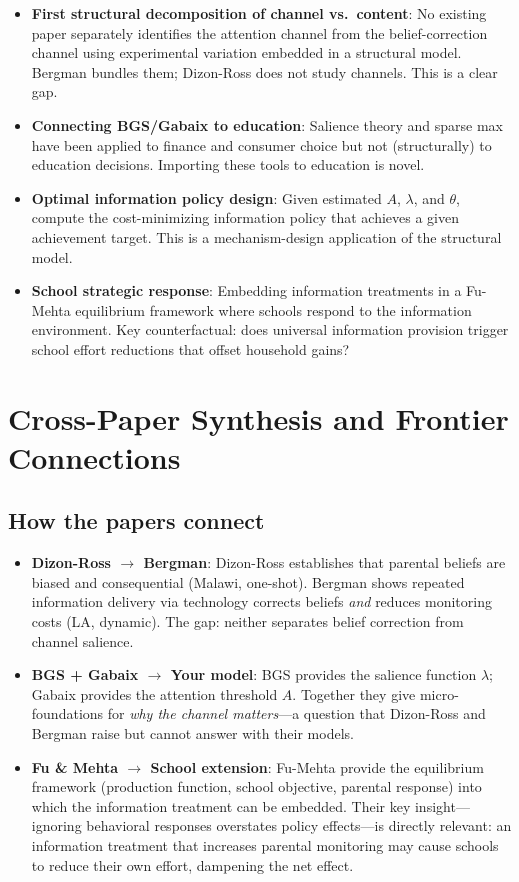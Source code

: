 \documentclass[11pt]{article}
\begin{document}
\begin{itemize}
  \item \textbf{First structural decomposition of channel vs.\ content}: No existing paper separately identifies the attention channel from the belief-correction channel using experimental variation embedded in a structural model. Bergman bundles them; Dizon-Ross does not study channels. This is a clear gap.
  \item \textbf{Connecting BGS/Gabaix to education}: Salience theory and sparse max have been applied to finance and consumer choice but not (structurally) to education decisions. Importing these tools to education is novel.
  \item \textbf{Optimal information policy design}: Given estimated $A$, $\lambda$, and $\theta$, compute the cost-minimizing information policy that achieves a given achievement target. This is a mechanism-design application of the structural model.
  \item \textbf{School strategic response}: Embedding information treatments in a Fu-Mehta equilibrium framework where schools respond to the information environment. Key counterfactual: does universal information provision trigger school effort reductions that offset household gains?
\end{itemize}

\section{Cross-Paper Synthesis and Frontier Connections}

\subsection{How the papers connect}

\begin{itemize}
  \item \textbf{Dizon-Ross $\to$ Bergman}: Dizon-Ross establishes that parental beliefs are biased and consequential (Malawi, one-shot). Bergman shows repeated information delivery via technology corrects beliefs \emph{and} reduces monitoring costs (LA, dynamic). The gap: neither separates belief correction from channel salience.
  \item \textbf{BGS + Gabaix $\to$ Your model}: BGS provides the salience function $\lambda$; Gabaix provides the attention threshold $A$. Together they give micro-foundations for \emph{why the channel matters}---a question that Dizon-Ross and Bergman raise but cannot answer with their models.
  \item \textbf{Fu \& Mehta $\to$ School extension}: Fu-Mehta provide the equilibrium framework (production function, school objective, parental response) into which the information treatment can be embedded. Their key insight---ignoring behavioral responses overstates policy effects---is directly relevant: an information treatment that increases parental monitoring may cause schools to reduce their own effort, dampening the net effect.
\end{itemize}
\end{document}
